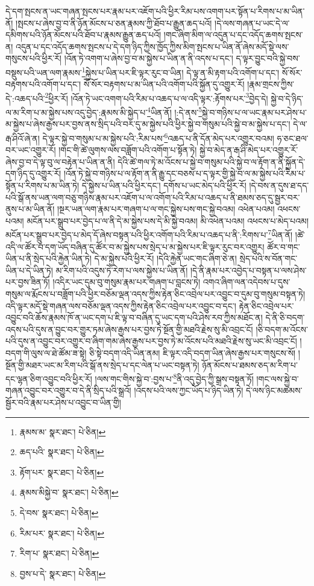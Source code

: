 དེ་དག་སྤངས་ན་ཡང་གཞན་སྤངས་པར་རྣམ་པར་འཇོག་པའི་ཕྱིར་རིམ་པས་འགག་པར་སྟོན་པ་རིགས་པ་མ་ཡིན་ནོ། །སྤངས་པ་ཞེས་བྱ་བ་ནི་ཉོན་མོངས་པ་ཅན་རྣམས་ཀྱི་ཐོབ་པ་རྒྱུན་ཆད་པའོ། །དེ་ལས་གཞན་པ་ཡང་དེ་ལ་དམིགས་པའི་ཉོན་མོངས་པའི་ཐོབ་པ་རྣམས་རྒྱུན་ཆད་པའོ། །གང་ཞིག་མིག་ལ་འདུན་པ་དང་འདོད་ཆགས་སྤངས་ན། འདུན་པ་དང་འདོད་ཆགས་སྤངས་པ་དེ་དག་ཉིད་ཀྱིས་ཁྱོད་ཀྱིས་མིག་སྤངས་པ་ཡིན་ནོ་ཞེས་མདོ་སྡེ་ལས་གསུངས་པའི་ཕྱིར་རོ། །འོན་ཏེ་འགག་པ་ཞེས་བྱ་བ་མ་སྐྱེས་པ་ཡིན་ན་ནི་འདས་པ་དང་། ད་ལྟར་བྱུང་བའི་སྐྱེ་བས་བསྡུས་པའི་ཡན་ལག་རྣམས་\footnote{རྣམས་མ་  སྣར་ཐང་།  པེ་ཅིན། }སྐྱེས་པ་ཡིན་པར་ཇི་ལྟར་རུང་བ་ཡིན། དེ་ལྟ་ན་མི་རྟག་པའི་འགོག་པ་དང་། སོ་སོར་བརྟགས་པའི་འགོག་པ་དང་། སོ་སོར་བརྟགས་པ་མ་ཡིན་པའི་འགོག་པའི་སྐྱོན་དུ་འགྱུར་རོ། །རྣམ་གྲངས་ཀྱིས་དེ་:འཆད་པའི་\footnote{ཆད་པའི་  སྣར་ཐང་།  པེ་ཅིན། }ཕྱིར་རོ། །འོན་ཏེ་ཡང་འགག་པའི་རིམ་པ་འཆད་པ་ལ་འདི་ལྟར་:རྟོགས་པར་\footnote{རྟོག་པར་  སྣར་ཐང་།  པེ་ཅིན། }བྱེད་དེ། སྐྱེ་བ་དེ་ཉིད་ལ་མ་རིག་པ་མ་སྐྱེས་པས་འདུ་བྱེད་:རྣམས་མི་སྐྱེད་པ་\footnote{རྣམས་མིསྐྱེ་བ་  སྣར་ཐང་།  པེ་ཅིན། }ཡིན་ནོ། །:དེ་ནས་\footnote{དེ་བས་  སྣར་ཐང་།  པེ་ཅིན། }སྐྱེ་བ་གཉིས་པ་ལ་ཡང་རྣམ་པར་ཤེས་པ་མ་སྐྱེས་པ་ཞེས་རྒྱས་པར་བྱས་ནས་སྲིད་པའི་བར་དུ་མ་སྐྱེས་པའི་ཕྱིར་སྐྱེ་བ་གསུམ་པའི་སྐྱེ་བ་མ་སྐྱེས་པ་དང་། དེ་ལ་རྒ་ཤིའོ་ཞེ་ན། དེ་ལྟར་སྐྱེ་བ་གསུམ་པ་མ་སྐྱེས་པའི་:རིམ་པས་\footnote{རིམ་པར་  སྣར་ཐང་།  པེ་ཅིན། }འཆད་པ་ནི་དོན་མེད་པར་འགྱུར་བའམ། ཧ་ཅང་ཐལ་བར་ཡང་འགྱུར་རོ། །གང་གི་ཚེ་ལུགས་ལས་བཟློག་པའི་འགོག་པ་སྟོན་ཏེ། སྐྱེ་བ་མེད་ན་རྒ་ཤི་མེད་པར་འགྱུར་རོ་ཞེས་བྱ་བ་དེ་ལྟ་བུ་ལ་བརྟེན་པ་ཡིན་ན་ནི། དེའི་ཚེ་གལ་ཏེ་མ་འོངས་པ་སྐྱེ་བ་གསུམ་པའི་སྐྱེ་བ་ལ་རྟོག་ན་ནི་སྐྱོན་དེ་དག་ཉིད་དུ་འགྱུར་རོ། །འོན་ཏེ་སྐྱེ་བ་གཉིས་པ་ལ་རྟོག་ན་ནི་རྒྱུ་དང་བཅས་པ་ད་ལྟར་གྱི་སྐྱེ་བ་ལ་མ་སྐྱེས་པའི་རིམ་པ་སྟོན་པ་རིགས་པ་མ་ཡིན་ཏེ། དེ་སྐྱེས་པ་ཡིན་པའི་ཕྱིར་དང་། དགོས་པ་ཡང་མེད་པའི་ཕྱིར་རོ། །དེ་བས་ན་དུས་ཐ་དད་པའི་སྒོ་ནས་ཡན་ལག་བཅུ་གཉིས་རྣམ་པར་འཇོག་པ་ལ་འགོག་པའི་རིམ་པ་འཆད་པ་ནི་ཐམས་ཅད་དུ་སྦྱར་བར་ནུས་པ་མ་ཡིན་ནོ། །སྔར་ཡན་ལག་རྣམ་པར་གཞག་པ་ལ་གང་སྐྱེས་པས་གང་སྐྱེ་བའམ། འཕེན་པའམ། འཕངས་པའམ། མངོན་པར་སྒྲུབ་པར་བྱེད་པ་ལ་ནི་དེ་མ་སྐྱེས་པས་དེ་མི་སྐྱེ་བའམ། མི་འཕེན་པའམ། འཕངས་པ་མེད་པའམ། མངོན་པར་སྒྲུབ་པར་བྱེད་པ་མེད་དོ་ཞེས་བསྟན་པའི་ཕྱིར་འགོག་པའི་རིམ་པ་འཆད་པ་ནི་:རིགས་པ་\footnote{རིག་པ་  སྣར་ཐང་།  པེ་ཅིན། }ཡིན་ནོ། །ཚེ་འདི་ལ་ཚོར་བ་དག་ཡོད་བཞིན་དུ་ཚོར་བ་མ་སྐྱེས་པས་སྲེད་པ་མ་སྐྱེས་པར་ཇི་ལྟར་རུང་བར་འགྱུར། ཚོར་བ་གང་ཡིན་པ་ནི་སྲེད་པའི་རྐྱེན་ཡིན་ཏེ། དེ་མ་སྐྱེས་པའི་ཕྱིར་རོ། །དེའི་རྐྱེན་ཡང་གང་ཞིག་ཅེ་ན། སྲེད་པའི་ས་བོན་གང་ཡིན་པ་དེ་ཡིན་ཏེ། མ་རིག་པའི་འདུས་ཏེ་རེག་པ་ལས་སྐྱེས་པ་ཡིན་ནོ། །དེ་ནི་རྣམ་པར་འབྱེད་པ་བསྟན་པ་ལས་ཤེས་པར་བྱས་ཟིན་ཏོ། །འདིར་ཡང་དུམ་བུ་གསུམ་རྣམ་པར་གཞག་པ་བླངས་ཏེ། འགའ་ཞིག་ལན་འདེབས་པ་དུས་གསུམ་ལ་རྨོངས་པ་བཟློག་པའི་ཕྱིར་བཅོམ་ལྡན་འདས་ཀྱིས་རྟེན་ཅིང་འབྲེལ་པར་འབྱུང་བ་དུམ་བུ་གསུམ་བསྟན་ཏེ། འདི་ལྟར་མདོ་སྡེ་གཞན་ལས་བཅོམ་ལྡན་འདས་ཀྱིས་རྟེན་ཅིང་འབྲེལ་པར་འབྱུང་བ་དང་། རྟེན་ཅིང་འབྲེལ་པར་འབྱུང་བའི་ཆོས་རྣམས་ཁོ་ན་ཡང་དག་པ་ཇི་ལྟ་བ་བཞིན་དུ་ཡང་དག་པའི་ཤེས་རབ་ཀྱིས་མཐོང་ན། དེ་ནི་ཅི་བདག་འདས་པའི་དུས་ན་བྱུང་བར་གྱུར་ཏམ་ཞེས་རྒྱས་པར་བྱས་ཏེ་སྔོན་གྱི་མཐའི་རྗེས་སུ་མི་འབྲང་ངོ། །ཅི་བདག་མ་འོངས་པའི་དུས་ན་འབྱུང་བར་འགྱུར་བ་ཞིག་གམ་ཞེས་རྒྱས་པར་བྱས་ཏེ་མ་འོངས་པའི་མཐའི་རྗེས་སུ་ཡང་མི་འབྲང་ངོ། །བདག་གི་ལུས་ལ་ཐེ་ཚོམ་ཟ་སྟེ། ཅི་སྟེ་བདག་འདི་ཡིན་ནམ། ཇི་ལྟར་འདི་བདག་ཡིན་ཞེས་རྒྱས་པར་གསུངས་སོ། །སྔོན་གྱི་མཐར་ཡང་མ་རིག་པའི་སྒོ་ནས་སྲེད་པ་དང་ལེན་པ་ཡང་བསྟན་ཏེ། ཉོན་མོངས་པ་ཐམས་ཅད་མ་རིག་པ་དང་ལྷན་ཅིག་འབྱུང་བའི་ཕྱིར་རོ། །ལས་གང་གིས་སྐྱེ་བ་:བྱས་པ་\footnote{བྱས་པ་དེ་  སྣར་ཐང་།  པེ་ཅིན། }ནི་འདུ་བྱེད་ཀྱི་སྒྲས་བསྟན་ཏོ། །གང་ལས་སྐྱེ་བ་གཞན་འབྱུང་བར་འགྱུར་བ་དེ་ནི་སྲིད་པའི་སྒྲའོ། །འདས་པའི་ལས་ཀྱང་ཡོད་པ་ཉིད་ཡིན་ཏེ། དེ་ལས་ཉིང་མཚམས་སྦྱོར་བའི་རྣམ་པར་ཤེས་པ་འབྱུང་བ་ཡིན་གྱི། 